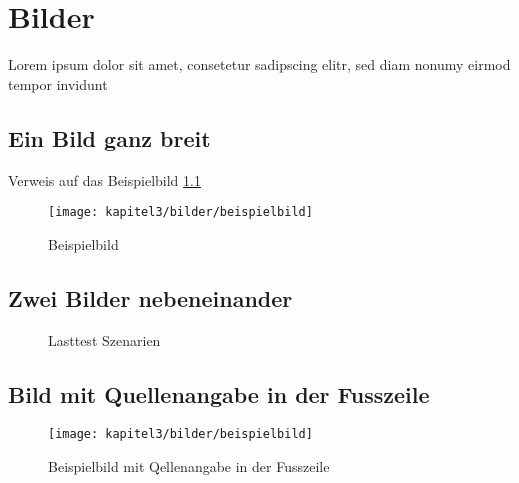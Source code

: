 
\chapter{Bilder}

Lorem ipsum dolor sit amet, consetetur sadipscing elitr, sed diam nonumy eirmod tempor invidunt 
\section{Ein Bild ganz breit} 
Verweis auf das Beispielbild \ref{fig:zuul}

\begin{figure}[htbp]
 \centering
 \texttt{[image: kapitel3/bilder/beispielbild]}
 \caption{Beispielbild}
 \label{fig:zuul}
\end{figure}


\section{Zwei Bilder nebeneinander} 


\begin{figure}
\hfill
{}
\caption{Lasttest Szenarien}
\end{figure}

\newpage
\section{Bild mit Quellenangabe in der Fusszeile}

\begin{figure}[h]
	\centering
	\texttt{[image: kapitel3/bilder/beispielbild]}
	\caption[Beispielbild mit Qellenangabe in der Fusszeile]{Beispielbild mit Qellenangabe in der Fusszeile\protect\footnotemark}
\end{figure}
